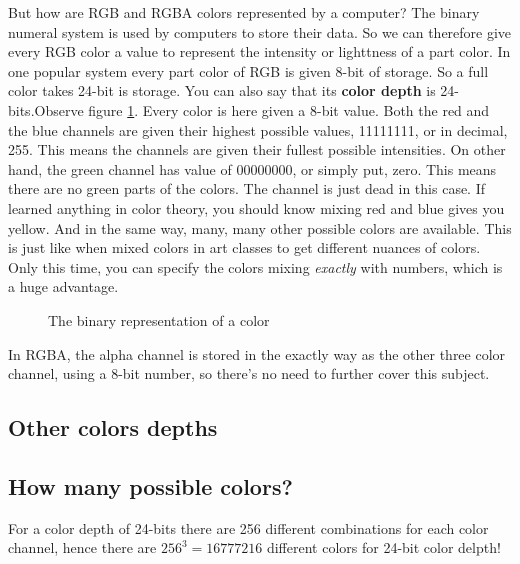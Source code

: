 But how are RGB and RGBA colors represented by a computer? The binary
numeral system is used by computers to store their data. So we can
therefore give every RGB color a value to represent the intensity or
lighttness of a part color. In one popular system every part color of
RGB is given 8-bit of storage. So a full color takes 24-bit is
storage. You can also say that its \textbf{color depth}
 is 24-bits.Observe figure \ref{fig:rgb-bits}. Every color is
here given a 8-bit value. Both the red and the blue channels are given
their highest possible values, 11111111, or in decimal, 255. This
means the channels are given their fullest possible intensities. On
other hand, the green channel has value of 00000000, or simply put,
zero. This means there are no green parts of the colors. The channel
is just dead in this case. If learned anything in color theory, you
should know mixing red and blue gives you yellow. And in the same way,
many, many other possible colors are available. This is just like when
mixed colors in art classes to get different nuances of colors. Only
this time, you can specify the colors mixing \emph{exactly} with
numbers, which is a huge advantage.


\begin{figure}[h]
  \centering
  \newcommand{\bitbox}[3]{
    \filldraw[fill=#2!80!white,draw=black] (#1,0) +(-.2,-.2) rectangle ++(.2,.2);
    \draw (#1,0) node{#3};
  }
  \caption{The binary representation of a color}
  \label{fig:rgb-bits}
\end{figure}


In RGBA, the alpha channel is stored in the exactly way as the other
three color channel, using a 8-bit number, so there's no need to
further cover this subject.

\subsection{Other colors depths}
\label{sec:other-colors-depths}

\subsection{How many possible colors?}
\label{sec:how-many-possible-colors}

\cite{puglia00:_handbook_dig_proj}

For a color depth of 24-bits there are 256 different combinations for
each color channel, hence there are $256^3 = 16777216$ different
colors for 24-bit color delpth! %

